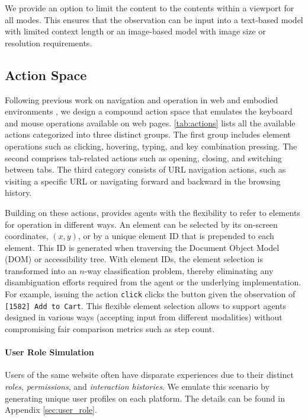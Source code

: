 We provide an option to limit the content to the contents within a viewport for all modes. %
This ensures that the observation can be input into a text-based model with limited context length or an image-based model with image size or resolution requirements.

\subsection{Action Space}\label{sec:actions}
Following previous work on navigation and operation in web and embodied environments \citep{shi2017world,liu2018reinforcement}, we design a compound action space that emulates the keyboard and mouse operations available on web pages.
\autoref{tab:actions} lists all the available actions categorized into three distinct groups. The first group includes element operations such as clicking, hovering, typing, and key combination pressing. The second comprises tab-related actions such as opening, closing, and switching between tabs. The third category consists of URL navigation actions, such as visiting a specific URL or navigating forward and backward in the browsing history.

Building on these actions, \ours provides agents with the flexibility to refer to elements for operation in different ways.
An element can be selected by its on-screen coordinates, %
$(x, y)$, or by a unique element ID that is prepended to each element. 
This ID is %
generated when traversing the Document Object Model (DOM) or accessibility tree. 
With element IDs, the element selection is transformed into an $n$-way classification problem, thereby eliminating any disambiguation efforts required from the agent or the underlying implementation. 
For example, issuing the action \texttt{click\!\! [1582]} clicks the button given the observation of \texttt{[1582] Add to Cart}.
This flexible element selection allows \ours to support agents designed in various ways (\eg accepting input from different modalities) without compromising fair comparison metrics such as step count.

\paragraph{User Role Simulation}
Users of the same website often have disparate experiences due to their distinct \emph{roles}, \emph{permissions}, and \emph{interaction histories}. 
We emulate this scenario by generating unique user profiles on each platform. The details can be found in Appendix \ref{sec:user_role}.

